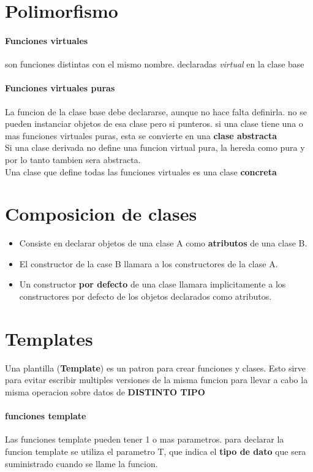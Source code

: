 \documentclass[11pt]{article}
\begin{document}
\section{Polimorfismo}
\paragraph{Funciones virtuales} son funciones distintas con el mismo nombre. declaradas \textit{virtual} en la clase base
\paragraph{Funciones virtuales puras} La funcion de la clase base debe declararse, aunque no hace falta definirla. no se pueden instanciar objetos de esa clase pero si punteros. si una clase tiene una o mas funciones virtuales puras, esta se convierte en una \textbf{clase abstracta}\\
Si una clase derivada no define una funcion virtual pura, la hereda como pura y por lo tanto tambien sera abstracta.\\
Una clase que define todas las funciones virtuales es una clase \textbf{concreta}
\section{Composicion de clases}
\begin{itemize}
	\item Consiste en declarar objetos de una clase A como \textbf{atributos} de una clase B. 
	\item El constructor de la case B llamara a los constructores de la clase A.
	\item Un constructor \textbf{por defecto} de una clase llamara implicitamente a los constructores por defecto de los 				objetos declarados como atributos.
\end{itemize}
\section{Templates}
Una plantilla (\textbf{Template}) es un patron para crear funciones y clases. Esto sirve para evitar escribir multiples versiones de la misma funcion para llevar a cabo la misma operacion sobre datos de \textbf{DISTINTO TIPO}\\
\paragraph{funciones template}
Las funciones template pueden tener 1 o mas parametros. para declarar la funcion template se utiliza el parametro T, que indica el \textbf{tipo de dato} que sera suministrado cuando se llame la funcion.\\
\end{document}
